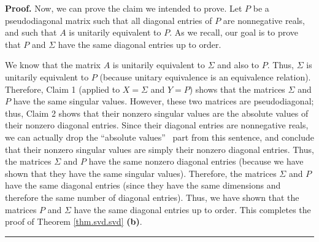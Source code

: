 \documentclass[numbers=enddot,12pt,final,onecolumn,notitlepage]{scrartcl}%
\numberwithin{exer}{subsection}
\theoremstyle{definition}
\newenvironment{proof}[1][Proof]{\noindent\textbf{#1.} }{\ \rule{0.5em}{0.5em}}
\begin{document}
\begin{proof}
Now, we can prove the claim we intended to prove. Let $P$ be a pseudodiagonal
matrix such that all diagonal entries of $P$ are nonnegative reals, and such
that $A$ is unitarily equivalent to $P$. As we recall, our goal is to prove
that $P$ and $\Sigma$ have the same diagonal entries up to order.

We know that the matrix $A$ is unitarily equivalent to $\Sigma$ and also to
$P$. Thus, $\Sigma$ is unitarily equivalent to $P$ (because unitary
equivalence is an equivalence relation). Therefore, Claim 1 (applied to
$X=\Sigma$ and $Y=P$) shows that the matrices $\Sigma$ and $P$ have the same
singular values. However, these two matrices are pseudodiagonal; thus, Claim 2
shows that their nonzero singular values are the absolute values of their
nonzero diagonal entries. Since their diagonal entries are nonnegative reals,
we can actually drop the \textquotedblleft absolute values\textquotedblright%
\ part from this sentence, and conclude that their nonzero singular values are
simply their nonzero diagonal entries. Thus, the matrices $\Sigma$ and $P$
have the same nonzero diagonal entries (because we have shown that they have
the same singular values). Therefore, the matrices $\Sigma$ and $P$ have the
same diagonal entries (since they have the same dimensions and therefore the
same number of diagonal entries). Thus, we have shown that the matrices $P$
and $\Sigma$ have the same diagonal entries up to order. This completes the
proof of Theorem \ref{thm.svd.svd} \textbf{(b)}.
\end{proof}
\end{document}
